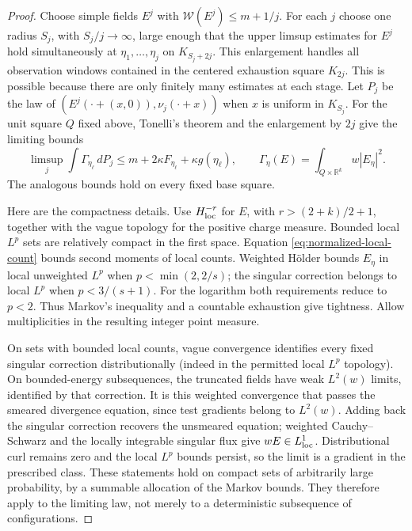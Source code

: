 \begin{proof}
Choose simple fields $E^j$ with $\mathcal W(E^j)\le m+1/j$.
For each $j$ choose one radius $S_j$, with $S_j/j\to\infty$,
large enough that the upper limsup estimates for $E^j$ hold
simultaneously at $\eta_1,\ldots,\eta_j$ on $K_{S_j+2j}$.
This enlargement handles all observation windows contained in the
centered exhaustion square $K_{2j}$.
This is possible because there are only finitely many estimates at
each stage.  Let $P_j$ be the law of
$(E^j(\cdot+(x,0)),\nu_j(\cdot+x))$ when $x$ is uniform in $K_{S_j}$.
For the unit square $Q$ fixed above, Tonelli's theorem and the
enlargement by $2j$ give the limiting bounds
\begin{equation}
 \limsup_j\int\Gamma_{\eta_\ell}\,dP_j
 \le m+2\kappa F_{\eta_\ell}+\kappa g(\eta_\ell),
 \qquad
 \Gamma_\eta(E)=\int_{Q\times\mathbb R^k}w|E_\eta|^2.
 \label{eq:normalized-orbit-bound}
\end{equation}
The analogous bounds hold on every fixed base square.

Here are the compactness details.  Use $H^{-r}_{\rm loc}$ for $E$,
with $r>(2+k)/2+1$, together with the vague topology for
the positive charge measure.  Bounded local $L^p$ sets are relatively
compact in the first space.  Equation
\eqref{eq:normalized-local-count} bounds second moments of local
counts.  Weighted H\"older bounds $E_\eta$ in local unweighted $L^p$
when $p<\min(2,2/s)$; the singular correction belongs to local $L^p$
when $p<3/(s+1)$.  For the logarithm both requirements reduce to
$p<2$.  Thus Markov's inequality and a countable exhaustion give
tightness.  Allow multiplicities in the resulting integer point
measure.

On sets with bounded local counts, vague convergence identifies every
fixed singular correction distributionally (indeed in the permitted
local $L^p$ topology).  On bounded-energy subsequences, the truncated
fields have weak $L^2(w)$ limits, identified by that correction.
It is this weighted convergence that passes the smeared divergence
equation, since test gradients belong to $L^2(w)$.
Adding back the singular correction recovers the unsmeared equation;
weighted Cauchy--Schwarz and the locally integrable singular flux give
$wE\in L^1_{\rm loc}$.  Distributional curl remains zero and the local
$L^p$ bounds persist, so the limit is a gradient in the prescribed
class.  These statements hold on compact sets of arbitrarily large
probability, by a summable allocation of the Markov bounds.
They therefore apply to the limiting law, not merely to a deterministic
subsequence of configurations.


\end{proof}
